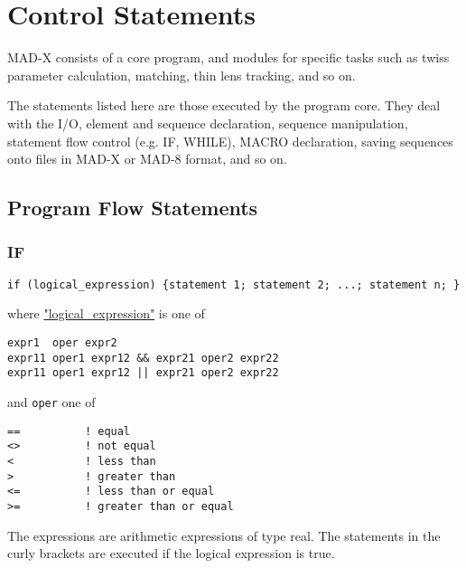 

%
%
%
%


\chapter{Control Statements} 
MAD-X consists of a core program, and modules for specific tasks such as
twiss parameter calculation, matching, thin lens tracking, and so on.  
 
The statements listed here are those executed by the program core. They
deal with the I/O, element and sequence declaration, sequence
manipulation, statement flow control (e.g. IF, WHILE), MACRO
declaration, saving sequences onto files in MAD-X or MAD-8 format, and
so on.  


%

\section{Program Flow Statements}

\subsection{IF}
\begin{verbatim}
if (logical_expression) {statement 1; statement 2; ...; statement n; }
\end{verbatim}
where \href{logical}{"logical\_expression"} is one of 
\begin{verbatim}
expr1  oper expr2
expr11 oper1 expr12 && expr21 oper2 expr22
expr11 oper1 expr12 || expr21 oper2 expr22
\end{verbatim} 
and \verb+oper+ one of 
\begin{verbatim}
==          ! equal
<>          ! not equal
<           ! less than
>           ! greater than
<=          ! less than or equal
>=          ! greater than or equal
\end{verbatim} 
The expressions are arithmetic expressions of type real. The statements
in the curly brackets are executed if the logical expression is true.  


